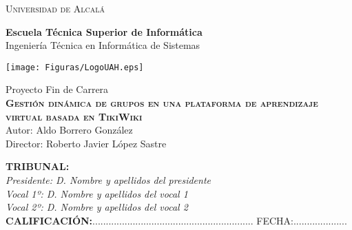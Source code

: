 

\begin{center}
\LARGE \textsc{Universidad de Alcalá}\\
\vspace{0.25cm}

\textbf{Escuela Técnica Superior de Informática}\\
Ingeniería Técnica en Informática de Sistemas\\
\end{center}

\vspace{0.25cm}

\begin{center}
\texttt{[image: Figuras/LogoUAH.eps]}\\
\end{center}

\begin{center}
\vspace{.5cm}

\LARGE Proyecto Fin de Carrera\\
\textbf{\Huge \textsc{{Gestión dinámica de grupos en una plataforma de aprendizaje virtual basada en TikiWiki}}}\\
\vspace{0.25cm}
\large Autor: Aldo Borrero González\\
Director: Roberto Javier López Sastre\\
\vspace{0.25cm}
\end{center}

\begin{flushleft}
\textbf{TRIBUNAL:}\\
\vspace{1.5cm}
\textit{Presidente: D. Nombre y apellidos del presidente}\\
\vspace{1.5cm}
\textit{Vocal 1º: D. Nombre y apellidos del vocal 1}\\
\vspace{1.5cm}
\textit{Vocal 2º: D. Nombre y apellidos del vocal 2}\\
\vspace{1.5cm}
\textbf{CALIFICACIÓN:}............................................................ FECHA:.................... \\
\end{flushleft}

\restoregeometry